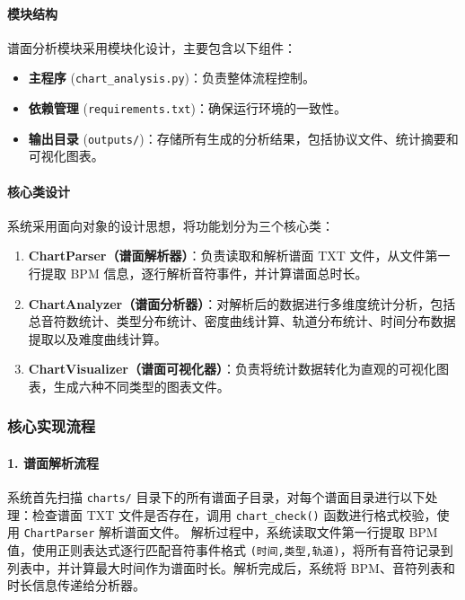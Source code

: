\documentclass[12pt, a4paper]{article}
\begin{document}
\paragraph{模块结构}
谱面分析模块采用模块化设计，主要包含以下组件：
\begin{itemize}
    \item \textbf{主程序} (\texttt{chart\_analysis.py})：负责整体流程控制。
    \item \textbf{依赖管理} (\texttt{requirements.txt})：确保运行环境的一致性。
    \item \textbf{输出目录} (\texttt{outputs/})：存储所有生成的分析结果，包括协议文件、统计摘要和可视化图表。
\end{itemize}

\paragraph{核心类设计}
系统采用面向对象的设计思想，将功能划分为三个核心类：
\begin{enumerate}
    \item \textbf{ChartParser（谱面解析器）}：负责读取和解析谱面 TXT 文件，从文件第一行提取 BPM 信息，逐行解析音符事件，并计算谱面总时长。
    \item \textbf{ChartAnalyzer（谱面分析器）}：对解析后的数据进行多维度统计分析，包括总音符数统计、类型分布统计、密度曲线计算、轨道分布统计、时间分布数据提取以及难度曲线计算。
    \item \textbf{ChartVisualizer（谱面可视化器）}：负责将统计数据转化为直观的可视化图表，生成六种不同类型的图表文件。
\end{enumerate}

\subsubsection{核心实现流程}

\paragraph{1. 谱面解析流程}
系统首先扫描 \texttt{charts/} 目录下的所有谱面子目录，对每个谱面目录进行以下处理：检查谱面 TXT 文件是否存在，调用 \texttt{chart\_check()} 函数进行格式校验，使用 \texttt{ChartParser} 解析谱面文件。
解析过程中，系统读取文件第一行提取 BPM 值，使用正则表达式逐行匹配音符事件格式 \texttt{(时间,类型,轨道)}，将所有音符记录到列表中，并计算最大时间作为谱面时长。解析完成后，系统将 BPM、音符列表和时长信息传递给分析器。
\end{document}
